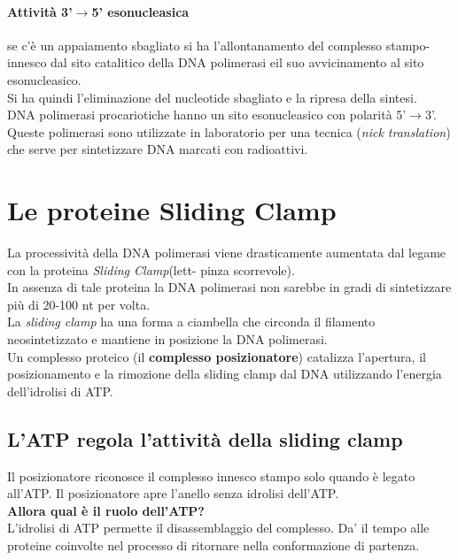 \documentclass{article}
\begin{document}
\paragraph{Attività 3'$\rightarrow$5' esonucleasica} se c'è un appaiamento sbagliato si ha l'allontanamento del complesso stampo-innesco dal sito catalitico della DNA polimerasi eil suo avvicinamento al sito esonucleasico.\\
Si ha quindi l'eliminazione del nucleotide sbagliato e la ripresa della sintesi.\\
DNA polimerasi procariotiche hanno un sito esonucleasico con polarità 5'$\rightarrow$3'.\\
Queste polimerasi sono utilizzate in laboratorio per una tecnica (\textit{nick translation}) che serve per sintetizzare DNA marcati con radioattivi.
\section{Le proteine Sliding Clamp} La processività della DNA polimerasi viene drasticamente aumentata dal legame con la proteina \textit{Sliding Clamp}(lett- pinza scorrevole).\\
In assenza di tale proteina la DNA polimerasi non sarebbe in gradi di sintetizzare più di 20-100 nt per volta.\\
La \textit{sliding clamp} ha una forma a ciambella che circonda il filamento neosintetizzato e mantiene in posizione la DNA polimerasi.\\
Un complesso proteico (il \textbf{complesso posizionatore}) catalizza l'apertura, il posizionamento e la rimozione della sliding clamp dal DNA utilizzando l'energia dell'idrolisi di ATP.
\subsection{L'ATP regola l'attività della sliding clamp} Il posizionatore riconosce il complesso innesco stampo solo quando è legato all'ATP. Il posizionatore apre l'anello senza idrolisi dell'ATP.\\
\textbf{Allora qual è il ruolo dell'ATP?}\\
L'idrolisi di ATP permette il disassemblaggio del complesso. Da' il tempo alle proteine coinvolte nel processo di ritornare nella conformazione di partenza.
\end{document}
